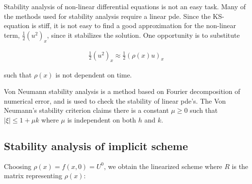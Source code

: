 

Stability analysis of non-linear differential equations is not an easy task. Many of the methods used for stability analysis require a linear pde. Since the KS-equation is stiff, it is not easy to find a good approximation for the non-linear term, $\frac{1}{2}(u^2)_x$, since it stabilizes the solution. One opportunity is to substitute 

\begin{align*}
\frac{1}{2}(u^2)_x \approx \frac{1}{2}(\rho(x)u)_x
\end{align*} 

such that $\rho(x)$ is not dependent on time. 

Von Neumann stability analysis is a method based on Fourier decomposition of numerical error, and is used to check the stability of linear pde's. The Von Neumann's stability criterion claims there is a constant $\mu \ge 0$ such that $|\xi| \le 1+ \mu k$ where $\mu$ is independent on both $h$ and $k$.


\subsection*{Stability analysis of implicit scheme}

 
Choosing $\rho(x) = f(x,0) = U^0$, we obtain the linearized scheme where $R$ is the matrix representing $\rho(x)$:


